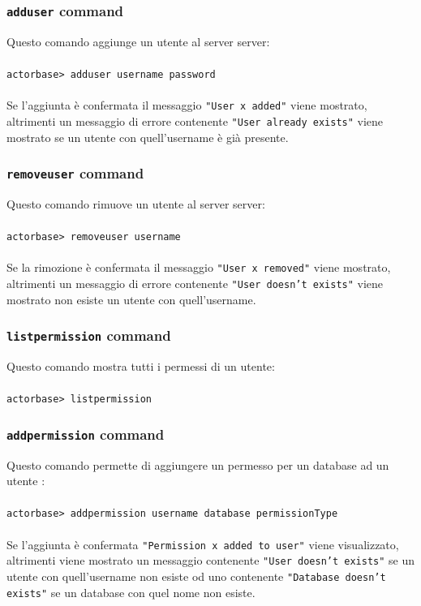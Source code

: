 \documentclass[a4paper]{article}
\begin{document}
	\subsubsection{\texttt{adduser} command}
	Questo comando aggiunge un utente al server server:
	\\ \\
	\texttt{actorbase>	adduser username password}
	\\ \\
	Se l'aggiunta è confermata il messaggio \texttt{"User x added"} viene mostrato, altrimenti un messaggio di errore contenente \texttt{"User already exists"} viene mostrato se un utente con quell'username è già presente.

	\subsubsection{\texttt{removeuser} command}
	Questo comando rimuove un utente al server server:
	\\ \\
	\texttt{actorbase>	removeuser username}
	\\ \\
	Se la rimozione è confermata il messaggio \texttt{"User x removed"} viene mostrato, altrimenti un messaggio di errore contenente \texttt{"User doesn't exists"} viene mostrato non esiste un utente con quell'username.
	
	\subsubsection{\texttt{listpermission} command}
	Questo comando mostra tutti i permessi di un utente:
	\\ \\
	\texttt{actorbase> listpermission}

	\subsubsection{\texttt{addpermission} command}
	Questo comando permette di aggiungere un permesso per un database ad un utente :
	\\ \\
	\texttt{actorbase>	addpermission username database permissionType}
	\\ \\	
	Se l'aggiunta è confermata \texttt{"Permission x added to user"} viene visualizzato, altrimenti viene mostrato un messaggio contenente \texttt{"User doesn't exists"} se un utente con quell'username non esiste od uno contenente \texttt{"Database doesn't exists"} se un database con quel nome non esiste.
\end{document}

